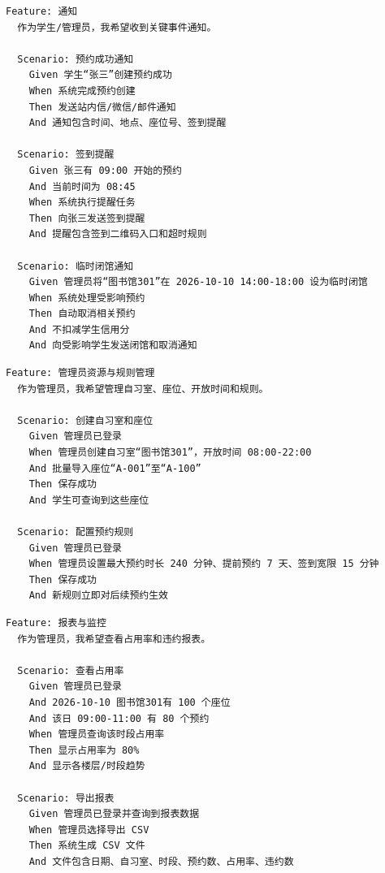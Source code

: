 \documentclass[11pt,a4paper]{article}
\begin{document}
\begin{framed}
\begin{verbatim}
Feature: 通知
  作为学生/管理员，我希望收到关键事件通知。

  Scenario: 预约成功通知
    Given 学生“张三”创建预约成功
    When 系统完成预约创建
    Then 发送站内信/微信/邮件通知
    And 通知包含时间、地点、座位号、签到提醒

  Scenario: 签到提醒
    Given 张三有 09:00 开始的预约
    And 当前时间为 08:45
    When 系统执行提醒任务
    Then 向张三发送签到提醒
    And 提醒包含签到二维码入口和超时规则

  Scenario: 临时闭馆通知
    Given 管理员将“图书馆301”在 2026-10-10 14:00-18:00 设为临时闭馆
    When 系统处理受影响预约
    Then 自动取消相关预约
    And 不扣减学生信用分
    And 向受影响学生发送闭馆和取消通知
\end{verbatim}
\end{framed}

\begin{framed}
\begin{verbatim}
Feature: 管理员资源与规则管理
  作为管理员，我希望管理自习室、座位、开放时间和规则。

  Scenario: 创建自习室和座位
    Given 管理员已登录
    When 管理员创建自习室“图书馆301”，开放时间 08:00-22:00
    And 批量导入座位“A-001”至“A-100”
    Then 保存成功
    And 学生可查询到这些座位

  Scenario: 配置预约规则
    Given 管理员已登录
    When 管理员设置最大预约时长 240 分钟、提前预约 7 天、签到宽限 15 分钟
    Then 保存成功
    And 新规则立即对后续预约生效
\end{verbatim}
\end{framed}

\begin{framed}
\begin{verbatim}
Feature: 报表与监控
  作为管理员，我希望查看占用率和违约报表。

  Scenario: 查看占用率
    Given 管理员已登录
    And 2026-10-10 图书馆301有 100 个座位
    And 该日 09:00-11:00 有 80 个预约
    When 管理员查询该时段占用率
    Then 显示占用率为 80%
    And 显示各楼层/时段趋势

  Scenario: 导出报表
    Given 管理员已登录并查询到报表数据
    When 管理员选择导出 CSV
    Then 系统生成 CSV 文件
    And 文件包含日期、自习室、时段、预约数、占用率、违约数
\end{verbatim}
\end{framed}
\end{document}
